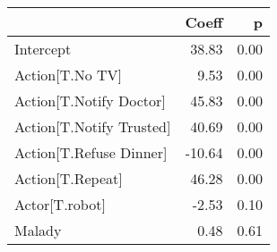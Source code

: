 \begin{tabular}{lrr}
\toprule
{} &  Coeff &    p \\
\midrule
Intercept                &  38.83 & 0.00 \\
Action[T.No TV]          &   9.53 & 0.00 \\
Action[T.Notify Doctor]  &  45.83 & 0.00 \\
Action[T.Notify Trusted] &  40.69 & 0.00 \\
Action[T.Refuse Dinner]  & -10.64 & 0.00 \\
Action[T.Repeat]         &  46.28 & 0.00 \\
Actor[T.robot]           &  -2.53 & 0.10 \\
Malady                   &   0.48 & 0.61 \\
\bottomrule
\end{tabular}
